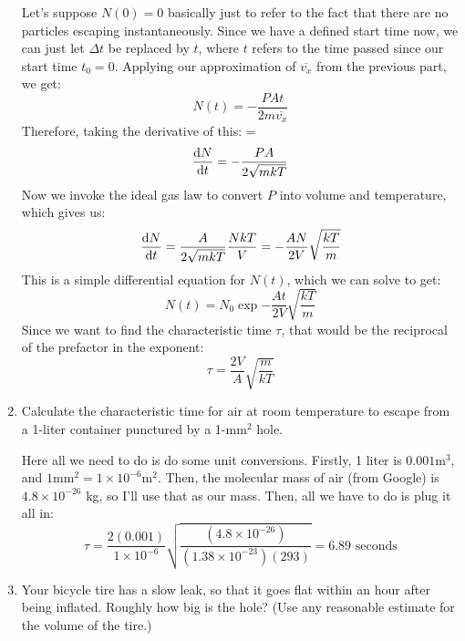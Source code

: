 \documentclass[11pt]{article}
\begin{document}
\begin{enumerate}[label=\alph*)]
			\begin{solution}
				Let's suppose $N(0) = 0$ basically just to refer to the fact that there are no particles escaping
				instantaneously. Since we have a defined start time now, we can just let $\Delta t$ be replaced
				by $t$, where $t$ refers to the time passed since our start time $t_0 = 0$. Applying our 
				approximation of $\overline {v_x}$ from the previous part, we get:
				\[
					N(t) = -\frac{PAt}{2m\overline{v_x}}
				\] 
				Therefore, taking the derivative of this: =
				\[
					\dv{N}{t} = -\frac{PA}{2\sqrt{mk T} }
				\]
				Now we invoke the ideal gas law to convert $P$ into volume and temperature, which gives us:
				\[
					\dv{N}{t} = \frac{A}{2\sqrt {m k T} }\frac{NkT}{V} = -\frac{AN}{2V}\sqrt{\frac{kT}{m}} 
				\] 
				This is a simple differential equation for $N(t)$, which we can solve to get:
				\[
					N(t) = N_0\exp{-\frac{At}{2V}\sqrt{\frac{kT}{m}} }
				\] 
				Since we want to find the characteristic time $\tau$, that would be the reciprocal of the 
				prefactor in the exponent:
				\[
				\tau = \frac{2V}{A}\sqrt{\frac{m}{kT}} 
				\] 
			\end{solution}
		\item Calculate the characteristic time for air at room temperature to escape from a 1-liter container 
			punctured by a 1-$\mathrm{mm^2}$ hole. 

			\begin{solution}
				Here all we need to do is do some unit conversions. Firstly, 1 liter is $0.001 \mathrm{ m^3}$, 
				and $1 \mathrm{mm^2} = 1 \times 10^{-6} \mathrm{m^2}$. Then, the molecular mass of air (from 
				Google) is $4.8 \times 10^{-26}$ kg, so I'll use that as our mass. Then, all we have to do 
				is plug it all in:
				\[
					\tau = \frac{2(0.001)}{1 \times 10^{-6}} \sqrt{\frac{(4.8 \times 10^{-26})}{(1.38\times 10^{-23})(293)}}  = 6.89 \text{ seconds}
				\] 
			\end{solution}
		\item Your bicycle tire has a slow leak, so that it goes flat within an hour after being inflated. 
			Roughly how big is the hole? (Use any reasonable estimate for the volume of the tire.)


\end{enumerate}
\end{document}
